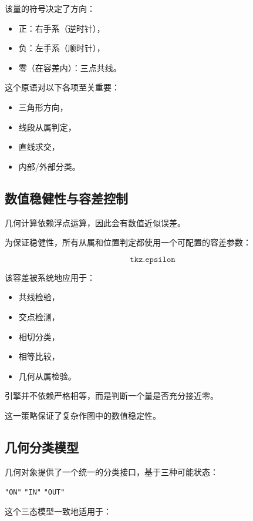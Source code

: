 该量的符号决定了方向：

\begin{itemize}
\item 正：右手系（逆时针），
\item 负：左手系（顺时针），
\item 零（在容差内）：三点共线。
\end{itemize}

这个原语对以下各项至关重要：

\begin{itemize}
\item 三角形方向，
\item 线段从属判定，
\item 直线求交，
\item 内部/外部分类。
\end{itemize}


\subsection{数值稳健性与容差控制}


几何计算依赖浮点运算，因此会有数值近似误差。

为保证稳健性，所有从属和位置判定都使用一个可配置的容差参数：

\[
\texttt{tkz.epsilon}
\]

该容差被系统地应用于：

\begin{itemize}
\item 共线检验，
\item 交点检测，
\item 相切分类，
\item 相等比较，
\item 几何从属检验。
\end{itemize}

引擎并不依赖严格相等，而是判断一个量是否充分接近零。

这一策略保证了复杂作图中的数值稳定性。

\subsection{几何分类模型}


几何对象提供了一个统一的分类接口，基于三种可能状态：

\begin{center}
\texttt{"ON"} \quad \texttt{"IN"} \quad \texttt{"OUT"}
\end{center}

这个三态模型一致地适用于：


